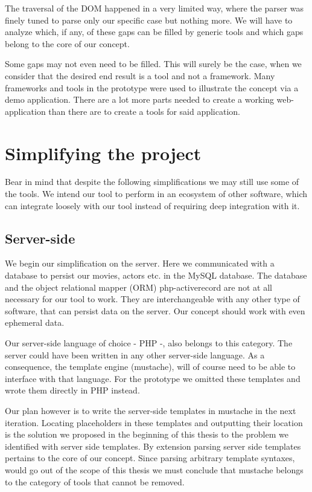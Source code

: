 \documentclass[thesis.tex]{subfiles}
\begin{document}
The traversal of the DOM happened in a very limited way, where the parser was
finely tuned to parse only our specific case but nothing more.
We will have to analyze which, if any, of these gaps can be filled by generic
tools and which gaps belong to the core of our concept.

Some gaps may not even need to be filled. This will surely be the case,
when we consider that the desired end result is a tool and not a framework.
Many frameworks and tools in the prototype were used to illustrate the concept
via a demo application. There are a lot more parts needed to create a working
web-application than there are to create a tools for said application.



\section{Simplifying the project}

Bear in mind that despite the following simplifications we may still use some
of the tools. We intend our tool to perform in an ecosystem of other software,
which can integrate loosely with our tool instead of requiring deep integration
with it.

\subsection{Server-side}
We begin our simplification on the server. Here we communicated with a database
to persist our movies, actors etc. in the MySQL database. The database and the
object relational mapper (ORM) php-activerecord are not at all necessary for our
tool to work. They are interchangeable with any other type of software, that can
persist data on the server. Our concept should work with even ephemeral data.

Our server-side language of choice - PHP -, also belongs to this category.
The server could have been written in any other server-side language.
As a consequence, the template engine (mustache), will of course need to be
able to interface with that language. For the prototype we omitted these
templates and wrote them directly in PHP instead.

Our plan however is to write the server-side templates in mustache in the next
iteration.
Locating placeholders in these templates and outputting their location
is the solution we proposed in the beginning of this thesis to the problem
we identified with server side templates.
By extension parsing server side templates pertains to the core of our concept.
Since parsing arbitrary template syntaxes, would go out of the scope of this
thesis we must conclude that mustache belongs to the category of tools that
cannot be removed.
\end{document}
